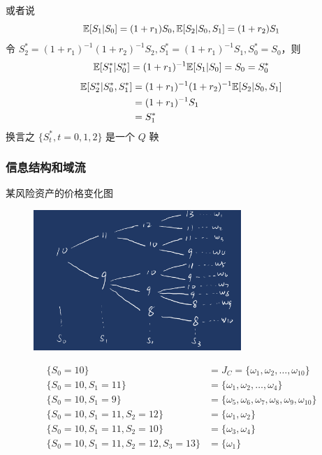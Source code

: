 或者说
\[
\mathbb E[S_1|S_0]=(1+r_1)S_0,\mathbb E[S_2|S_0,S_1]=(1+r_2)S_1
\]
令 $S_2^*=(1+r_1)^{-1}(1+r_2)^{-1}S_2,S_1^*=(1+r_1)^{-1}S_1,S_0^*=S_0$，则
\[
\mathbb E[S_1^*|S_0^*]=(1+r_1)^{-1}\mathbb E[S_1|S_0]=S_0=S_0^*
\]
\[
\begin{aligned}
    \mathbb E[S_2^*|S_0^*,S_1^*]&=(1+r_1)^{-1}(1+r_2)^{-1}\mathbb E[S_2|S_0,S_1]\\
    &=(1+r_1)^{-1}S_1\\
    &=S_1^*
\end{aligned}
\]
换言之 $\{S_t^*,t=0,1,2\}$ 是一个 $Q$ 鞅

\subsubsection{信息结构和域流}

某风险资产的价格变化图

\begin{figure}[H]
    \centering
    \includegraphics[width=0.7\textwidth]{figures/某风险资产价格变化图.jpeg} %
    \label{fig:asset-price-chg}
\end{figure}

\begin{align*}
    \{ S_0 = 10 \} &= J_C = \{ \omega_1, \omega_2, \ldots, \omega_{10} \} \\
    \{ S_0 = 10, S_1 = 11 \} &= \{ \omega_1, \omega_2, \ldots, \omega_4 \} \\
    \{ S_0 = 10, S_1 = 9 \} &= \{ \omega_5, \omega_6, \omega_7, \omega_8, \omega_9, \omega_{10} \} \\
    \{ S_0 = 10, S_1 = 11, S_2 = 12 \} &= \{ \omega_1, \omega_2 \} \\
    \{ S_0 = 10, S_1 = 11, S_2 = 10 \} &= \{ \omega_3, \omega_4 \} \\
    \{ S_0 = 10, S_1 = 11, S_2 = 12, S_3 = 13 \} &= \{ \omega_1 \}
\end{align*}


